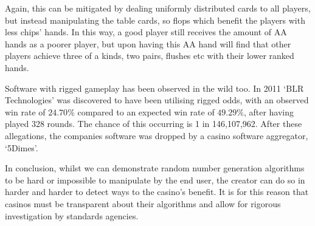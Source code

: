 Again, this can be mitigated by dealing uniformly distributed cards to all
players, but instead manipulating the table cards, so flops which benefit
the players with less chips' hands. In this way, a good player still receives
the amount of AA hands as a poorer player, but upon having this AA hand will
find that other players achieve three of a kinds, two pairs, flushes etc
with their lower ranked hands.

Software with rigged gameplay has been observed in the wild too. In 2011 
`BLR Technologies' was discovered to have been utilising rigged odds, with an 
observed win rate of $24.70\%$ compared to an expected win rate of $49.29\%$,
after having played 328 rounds. The chance of this occurring is 1 in 
146,107,962. \parencite{website:shackleford2011} After these allegations, 
the companies software was dropped by a casino software aggregator, `5Dimes'.

In conclusion, whilst we can demonstrate random number generation algorithms
to be hard or impossible to manipulate by the end user, the creator can do so
in harder and harder to detect ways to the casino's benefit. It is for this
reason that casinos must be transparent about their algorithms and allow
for rigorous investigation by standards agencies.
